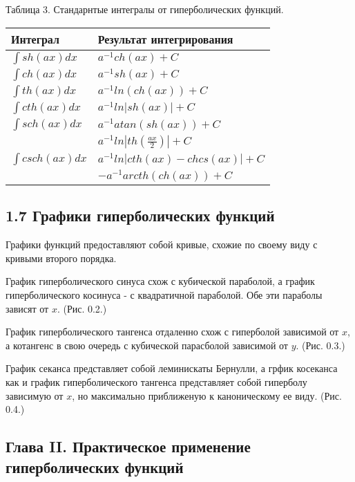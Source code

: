 Таблица 3. Стандарнтые интегралы от гиперболических функций.
\begin{center}
    \begin{tabular}{| p{5cm} | p{7cm} |}
        \hline
        Интеграл & Результат интегрирования\\ \hline
       $\int sh(ax) dx$ & $a^{-1}ch(ax)+C$\\ \hline
       $\int ch(ax) dx$ & $a^{-1}sh(ax)+C$\\ \hline
       $\int th(ax) dx$ & $a^{-1}ln(ch(ax))+C$\\ \hline
       $\int cth(ax) dx$ & $a^{-1}ln|sh(ax)|+C$\\ \hline
       $\int sch(ax) dx$ & $a^{-1}atan(sh(ax))+C$\\ \hline
        & $a^{-1}ln|th(\frac{ax}{2})|+C$\\ 
       $\int csch(ax) dx$ & $a^{-1}ln|cth(ax)-chcs(ax)|+C$\\ 
        & $-a^{-1}arcth(ch(ax))+C$\\ \hline
    \end{tabular}
\end{center}

\subsection*{1.7 Графики гиперболических функций}
Графики функций предоставляют собой кривые, схожие по своему виду с кривыми второго порядка.

График гиперболического синуса схож с кубической параболой, а график гиперболического косинуса - с квадратичной параболой. Обе эти параболы зависят от $x$. (Рис. 0.2.) 

График гиперболического тангенса отдаленно схож с гиперболой зависимой от $x$, а котангенс в свою очередь с кубической парасболой зависимой от $y$. (Рис. 0.3.)

График секанса представляет собой %
леминискаты Бернулли, а грфик косеканса как и график гиперболического тангенса представляет собой гиперболу зависимую от $x$, но максимально приближеную к каноническому ее виду. (Рис. 0.4.)



\newpage
\subsection*{Глава II. Практическое применение гиперболических функций}
